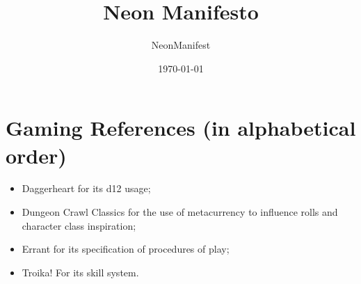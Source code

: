 \documentclass{article}
\title{Neon Manifesto}
\author{NeonManifest}
\date{\today}
\begin{document}
\maketitle

\tableofcontents









\section{Gaming References (in alphabetical order)}
\begin{itemize}
    \item {Daggerheart for its d12 usage;}
    \item {Dungeon Crawl Classics for the use of metacurrency to influence rolls and character class inspiration;}
    \item {Errant for its specification of procedures of play;}
    \item {Troika! For its skill system.}
\end{itemize}
\end{document}
